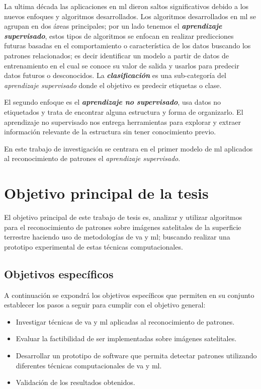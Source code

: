 La ultima década las aplicaciones en \ac{ml} dieron  saltos significativos debido a los nuevos enfoques y algoritmos desarrollados. Los algoritmos desarrollados en \ac{ml} se agrupan  en dos áreas principales; por un lado tenemos  el \textbf{\textit{aprendizaje supervisado}}, estos tipos de algoritmos se enfocan en realizar predicciones futuras basadas en el comportamiento o característica de los datos buscando los patrones relacionados; es decir identificar un modelo a partir de datos de entrenamiento en el cual se conoce su valor de salida y usarlos para predecir datos futuros o desconocidos. La \textbf{\textit{clasificación}} es una sub-categoría del \textit{aprendizaje supervisado} donde el objetivo es predecir etiquetas o clase.

El segundo enfoque es el \textbf{ \textit{aprendizaje no supervisado}}, usa datos no etiquetados y trata de encontrar alguna estructura y forma de organizarlo. El aprendizaje no supervisado nos entrega herramientas para explorar y extraer información relevante de la estructura sin tener conocimiento previo. 

En este trabajo de investigación se centrara en el primer modelo de \ac{ml} aplicados al reconocimiento de patrones el  \textit{aprendizaje supervisado}.


\section{Objetivo principal de la tesis}\label{sec:ObjGral}

El objetivo principal de este trabajo de tesis es, analizar y utilizar algoritmos para el  reconocimiento de patrones sobre imágenes satelitales de la superficie terrestre haciendo uso de metodologías de \ac{va} y \ac{ml}; buscando realizar una prototipo experimental de estas técnicas computacionales.


\subsection{Objetivos específicos }\label{sub:ObjEspecif}
A continuación se expondrá los objetivos específicos que permiten en su conjunto establecer los pasos a seguir para  cumplir con el objetivo general:
\begin{itemize}
 \item Investigar técnicas de \ac{va} y \ac{ml} aplicadas al reconocimiento de patrones.
 \item Evaluar la factibilidad de ser implementadas sobre imágenes satelitales.
 \item Desarrollar un prototipo de software que permita detectar patrones utilizando diferentes técnicas computacionales de \ac{va} y \ac{ml}.
 \item Validación de los resultados obtenidos.
\end{itemize}


